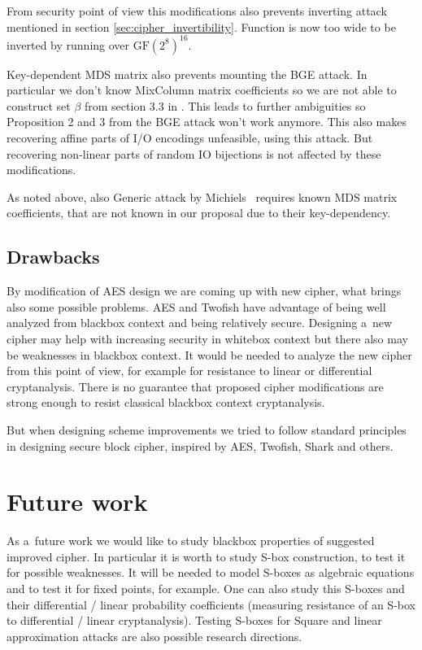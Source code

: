\documentclass[11pt,oneside,final]{fithesis2}
\newcommand{\gfe}{\ensuremath{\text{GF}\left(2^8\right)}}
\begin{document}
    From security point of view this modifications also prevents inverting attack mentioned in section \ref{sec:cipher_invertibility}. Function is now too wide to be
    inverted by running over $\gfe^{16}$. 
    
    Key-dependent MDS matrix also prevents mounting the BGE attack. In particular we don't know MixColumn matrix coefficients so we are not able to construct set $\beta$
    from section 3.3 in \cite{Billet:2004:CWB:2080787.2080809}. This leads to further ambiguities so Proposition 2 and 3 from the BGE attack won't work anymore. 
    This also makes recovering 
    affine parts of I/O encodings unfeasible, using this attack. But recovering non-linear parts of random IO bijections is not affected by these modifications.

    As noted above, also  Generic attack by Michiels~\citep{Michiels:2007:MST:1314276.1314291} requires known MDS matrix coefficients, that are not known in our proposal
    due to their key-dependency.
    
    \section{Drawbacks}
    By modification of AES design we are coming up with new cipher, what brings also some possible problems. AES and Twofish have advantage of being well analyzed from blackbox 
    context and being relatively secure. Designing a~new cipher may help with increasing security in whitebox context but there also may be weaknesses in blackbox context. 
    It would be needed to analyze the new cipher from this point of view, for example for resistance to linear or differential cryptanalysis. There is no guarantee that 
    proposed cipher modifications are strong enough to resist classical blackbox context cryptanalysis.
    
    But when designing scheme improvements we tried to follow standard principles in designing secure block cipher, inspired by AES, Twofish, Shark and others.
    
    
\chapter{Future work}\label{sec:futurework}
    As a~future work we would like to study blackbox properties of suggested improved cipher. In particular it is worth to study S-box construction, to test
    it for possible weaknesses. It will be needed to model S-boxes as algebraic equations and to test it for fixed points, for example. One can also study this S-boxes
    and their differential / linear probability coefficients (measuring resistance of an S-box to differential / linear cryptanalysis). Testing S-boxes 
    for Square and linear approximation attacks are also possible research directions.
    
\end{document}
